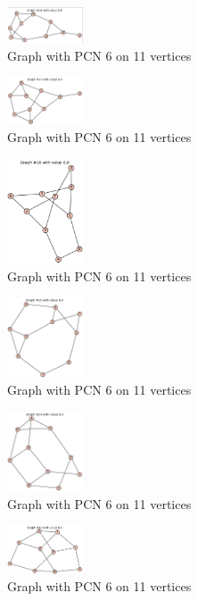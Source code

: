 \documentclass[12pt,a4paper]{amsart}
\theoremstyle{definition}
\theoremstyle{plain}
\begin{document}
\begin{figure}[h]
    \centering
    \includegraphics[width=0.2\textwidth]{Images/26}
    \caption{Graph with PCN 6 on 11 vertices}
\end{figure}
\begin{figure}[h]
    \centering
    \includegraphics[width=0.2\textwidth]{Images/27}
    \caption{Graph with PCN 6 on 11 vertices}
\end{figure}
\begin{figure}[h]
    \centering
    \includegraphics[width=0.2\textwidth]{Images/28}
    \caption{Graph with PCN 6 on 11 vertices}
\end{figure}
\begin{figure}[h]
    \centering
    \includegraphics[width=0.2\textwidth]{Images/29}
    \caption{Graph with PCN 6 on 11 vertices}
\end{figure}
\begin{figure}[h]
    \centering
    \includegraphics[width=0.2\textwidth]{Images/30}
    \caption{Graph with PCN 6 on 11 vertices}
\end{figure}
\begin{figure}[h]
    \centering
    \includegraphics[width=0.2\textwidth]{Images/31}
    \caption{Graph with PCN 6 on 11 vertices}
\end{figure}
\end{document}

